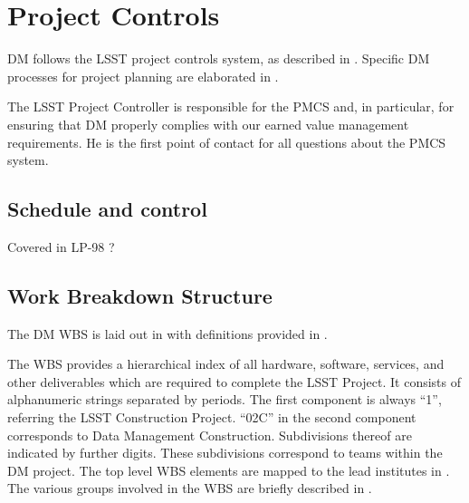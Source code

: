 \newpage
\section{Project Controls}\label{sect:dmpc}

DM follows the LSST project controls system, as described in .
Specific DM processes for project planning are elaborated in .

The LSST Project Controller is responsible for the PMCS and, in particular, for ensuring that DM properly complies with our earned value management requirements.
He is the first point of contact for all questions about the PMCS system.

\subsection{Schedule  and control}
Covered in LP-98 ?

\subsection{Work Breakdown Structure} \label{sect:WBS}

The DM WBS is laid out in  with definitions provided in .

The WBS provides a hierarchical index of all hardware, software, services, and other deliverables which are required to complete the LSST Project.
It consists of alphanumeric strings separated by periods.
The first component is always “1”, referring the LSST Construction Project.
``02C'' in the second component corresponds to Data Management Construction.
Subdivisions thereof are indicated by further digits.
These subdivisions correspond to teams within the DM project.
The top level WBS elements are mapped to the lead institutes in .
The various groups involved in the WBS are briefly described in .

